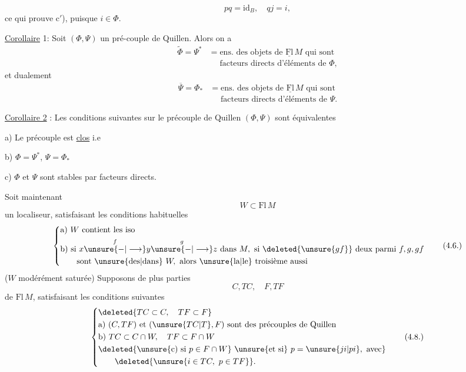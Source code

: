 
\[
pq=\mathrm{id}_B,\quad qj=i,
\]
ce qui prouve c$'$), puisque $i\in\Phi$.

\uline{Corollaire} 1: Soit $(\Phi,\Psi)$ un pré-couple de Quillen.
Alors on a
\[
\begin{aligned}
\widetilde{\Phi}=\Psi^*&=\text{ens. des objets de }\underline{\mathrm{Fl}}\,M\text{ qui sont}\\
&\phantom{=}\text{facteurs directs d'éléments de }\Phi,
\end{aligned}
\tag*{(4.3.)}
\]
et dualement
\[
\begin{aligned}
\overline{\Psi}=\Phi_*&=\text{ens. des objets de }\underline{\mathrm{Fl}}\,M\text{ qui sont}\\
&\phantom{=}\text{facteurs directs d'éléments de }\Psi.
\end{aligned}
\tag*{(4.4)}
\]

\uline{Corollaire 2} : Les conditions suivantes sur le
précouple de Quillen $(\Phi,\Psi)$ sont équivalentes

a) Le précouple est \uline{clos} i.e  \inserted{$\Phi=\widetilde\Phi$, $\Psi=\overline\Psi$}

b) $\Phi=\Psi^*$, $\Psi=\Phi_*$

c) $\Phi$ et $\Psi$ sont stables par facteurs directs.

Soit maintenant
\[
W\subset\mathrm{Fl}\,M
\tag*{(4.5.)}
\]
un localiseur, satisfaisant les conditions habituelles
\[
\left\{\begin{aligned}
&\text{a) }W\text{ contient les iso}\\
&\text{b) si }x\overset f{\unsure{-|\longrightarrow}}y\overset g{\unsure{-|\longrightarrow}}z\text{ dans }M,\text{ si }\deleted{\unsure{gf}}\text{ deux parmi }f,g,gf\\
&\qquad\text{sont \unsure{des|dans} }W,\text{ alors \unsure{la|le} troisième aussi}
\end{aligned}\right.
\tag*{(4.6.)}
\]
($W$ modérément saturée)  Supposons
de plus    parties
\[
C,TC,\quad F,TF
\tag*{(4.7)}
\]
de $\mathrm{Fl}\,M$, satisfaisant les conditions suivantes
\[
\left\{\begin{aligned}
&\deleted{TC\subset C,\quad TF\subset F}\\
&\text{a) }(C,TF)\text{ et }(\unsure{TC|T},F)\text{ sont des précouples de Quillen}\\
&\text{b) }TC\subset C\cap W,\quad TF\subset F\cap W\\
&\deleted{\unsure{\text{c) si }p\in F\cap W}\text{ \unsure{et si} }p=\unsure{ji|pi},\text{ avec}}\\
&\qquad\deleted{\unsure{i\in TC,\ p\in TF}}.
\end{aligned}\right.
\tag*{(4.8.)}
\]
